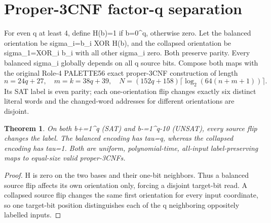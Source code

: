 \documentclass{article}
\newtheorem{theorem}{Theorem}
\begin{document}
\section{Proper-3CNF factor-q separation}
For even q at least 4, define H(b)=1 if b=0^q, otherwise zero. Let the balanced orientation be sigma_i=b_i XOR H(b), and the collapsed orientation be sigma_1=XOR_i b_i with all other sigma_i zero. Both preserve parity. Every balanced sigma_i globally depends on all q source bits.
Compose both maps with the original Role-4 PALETTE56 exact proper-3CNF construction of length
\[
n=24q+27,\quad m=k=38q+39,\quad
N=(152q+158)\lceil\log_2(64(n+m+1))\rceil.
\]
Its SAT label is even parity; each one-orientation flip changes exactly six distinct literal words and the changed-word addresses for different orientations are disjoint.
\begin{theorem}
On both b+=1^q (SAT) and b-=1^{q-1}0 (UNSAT), every source flip changes the label. The balanced encoding has tau=q, whereas the collapsed encoding has tau=1. Both are uniform, polynomial-time, all-input label-preserving maps to equal-size valid proper-3CNFs.
\end{theorem}
\begin{proof}
H is zero on the two bases and their one-bit neighbors. Thus a balanced source flip affects its own orientation only, forcing a disjoint target-bit read. A collapsed source flip changes the same first orientation for every input coordinate, so one target-bit position distinguishes each of the q neighboring oppositely labelled inputs.
\end{proof}
\end{document}
